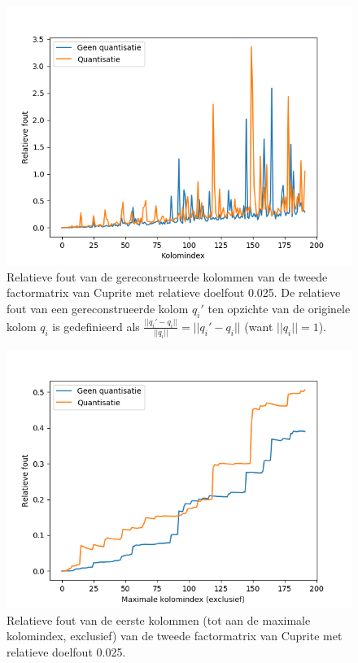 \begin{figure}[]
  \centering
  \includegraphics[scale=0.7]{images/orthogonality_compression_basic.png}
  \caption{Relatieve fout van de gereconstrueerde kolommen van de tweede factormatrix van Cuprite met relatieve doelfout 0.025. De relatieve fout van een gereconstrueerde kolom $q_i'$ ten opzichte van de originele kolom $q_i$ is gedefinieerd als $\frac{||q_i' - q_i||}{||q_i||} = ||q_i' - q_i||$ (want $||q_i|| = 1$).}
\label{fig:orthogonality-compression-basic}
\end{figure}

\begin{figure}[]
  \centering
  \includegraphics[scale=0.7]{images/orthogonality_compression_basic_matrix.png}
  \caption{Relatieve fout van de eerste kolommen (tot aan de maximale kolomindex, exclusief) van de tweede factormatrix van Cuprite met relatieve doelfout 0.025.}
\label{fig:orthogonality-compression-basic-matrix}
\end{figure}

